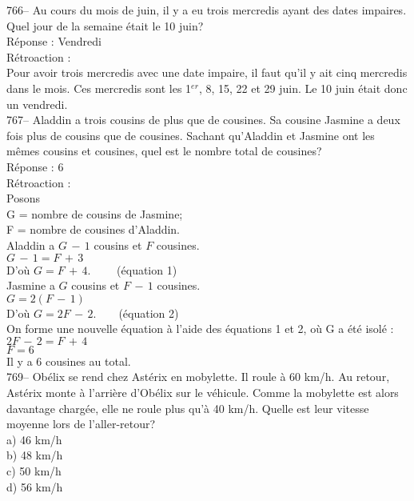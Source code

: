 ﻿\documentclass[letterpaper, 12pt]{article}
\begin{document}
766-- Au cours du mois de juin, il y a eu trois mercredis ayant des dates
impaires.  Quel jour de la semaine \'etait le 10 juin?\\

R\'eponse : Vendredi\\

R\'etroaction : \\
Pour avoir trois mercredis avec une date impaire, il faut qu'il y ait cinq
mercredis dans le mois.  Ces mercredis sont les 1$^{er}$, 8, 15, 22 et 29
juin.  Le 10 juin \'etait donc un vendredi.  \\


767-- Aladdin a trois cousins de plus que de cousines.  Sa cousine Jasmine a
deux fois plus de cousins que de cousines.  Sachant qu'Aladdin et Jasmine
ont les m\^emes cousins et cousines, quel est le nombre total de cousines?\\

R\'eponse : 6 \\

R\'etroaction : \\
Posons\\
G = nombre de cousins de Jasmine;\\
F = nombre de cousines d'Aladdin.\\

Aladdin a $G\,-\,1$ cousins et $F$ cousines.\\
$G\,-\,1=F\,+\,3$\\
D'o\`u $G=F\,+\,4. \qquad$ (\'equation 1)\\

Jasmine a $G$ cousins et $F\,-\,1$ cousines.  \\
$G=2\left( F\,-\,1\right)  $\\
D'o\`u $G=2F\,-\,2. \qquad $(\'equation 2) \\

On forme une nouvelle \'equation \`a l'aide des \'equations 1 et 2, o\`u G a
\'et\'e isol\'e :\\
$2F\,-\,2=F\,+\,4$\\
$F=6$\\
Il y a 6 cousines au total.\\



769-- Ob\'elix se rend chez Ast\'erix en mobylette.  Il roule \`a 60 km/h.
Au retour, Ast\'erix monte \`a l'arri\`ere d'Ob\'elix sur le v\'ehicule.
Comme la mobylette est alors davantage charg\'ee, elle ne roule plus qu'\`a
40 km/h.  Quelle est leur vitesse moyenne lors de l'aller-retour?\\
a) 46 km/h\\
b) 48 km/h\\
c) 50 km/h\\
d) 56 km/h\\
\end{document}
